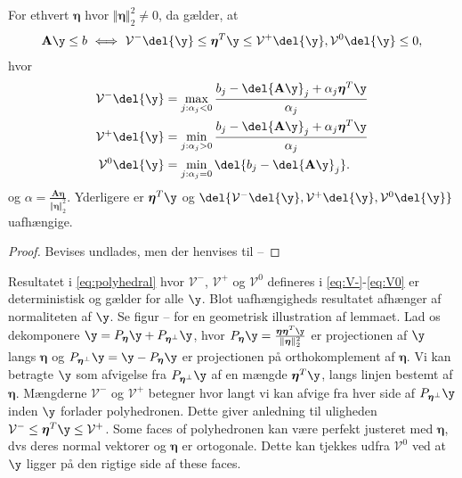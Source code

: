 \begin{lem} \label{lem:polyhedral}
For ethvert \(\boldsymbol{\eta}\) hvor \(\Vert  \boldsymbol{\eta} \Vert_2^2 \neq 0\), da gælder, at
\begin{align}
\mathbf{A} \y \leq b \ \Longleftrightarrow \ \mathcal{V}^- \del{\y} \leq \boldsymbol{\eta}^T \y \leq \mathcal{V}^+ \del{\y}, \mathcal{V}^0 \del{\y} \leq 0, \label{eq:polyhedral}
\end{align}
hvor
\begin{align}
\mathcal{V}^- \del{\y} &= \max_{j: \alpha_j <0} \frac{b_j - \del{\mathbf{A} \y}_j + \alpha_j \boldsymbol{\eta}^T \y}{\alpha_j} \label{eq:V-} \\
\mathcal{V}^+ \del{\y} &= \min_{j: \alpha_j >0} \frac{b_j - \del{\mathbf{A} \y}_j + \alpha_j \boldsymbol{\eta}^T \y}{\alpha_j} \label{eq:V+} \\
\mathcal{V}^0 \del{\y} &= \min_{j: \alpha_j =0} \del{b_j - \del{\mathbf{A} \y}_j}.  \label{eq:V0} 
\end{align}
og \(\alpha=\frac{\mathbf{A} \boldsymbol{\eta}}{\Vert  \boldsymbol{\eta} \Vert_2^2}\).
Yderligere  er \(\boldsymbol{\eta}^T \y\) og \(\del{\mathcal{V}^-\del{\y}, \mathcal{V}^+\del{\y},\mathcal{V}^0\del{\y}}\) uafhængige. 
\end{lem}
\begin{proof}
Bevises undlades, men der henvises til --
\end{proof}
Resultatet i \eqref{eq:polyhedral} hvor \(\mathcal{V}^-\), \(\mathcal{V}^+\) og \(\mathcal{V}^0\) defineres i \eqref{eq:V-}-\eqref{eq:V0} er deterministisk og gælder for alle \(\y\).
Blot uafhængigheds resultatet afhænger af normaliteten af \(\y\).
Se figur -- for en geometrisk illustration af lemmaet.
Lad os dekomponere \(\y=P_{\boldsymbol{\eta}} \y + P_{\boldsymbol{\eta}^\perp} \y\), hvor \(P_{\boldsymbol{\eta}} \y = \frac{\boldsymbol{\eta} \boldsymbol{\eta}^T \y}{\Vert \boldsymbol{\eta} \Vert_2^2}\) er projectionen af \(\y\) langs \(\boldsymbol{\eta}\) og  \(P_{\boldsymbol{\eta}^\perp} \y = \y - P_{\boldsymbol{\eta}} \y\) er projectionen på orthokomplement af \(\boldsymbol{\eta}\).
Vi kan betragte \(\y\) som afvigelse fra \(P_{\boldsymbol{\eta}^\perp} \y\) af en mængde \(\boldsymbol{\eta}^T \y\), langs linjen bestemt af \(\boldsymbol{\eta}\).
Mængderne \(\mathcal{V}^-\) og \(\mathcal{V}^+\) betegner hvor langt vi kan afvige fra hver side af \(P_{\boldsymbol{\eta}^\perp} \y\) inden \(\y\) forlader polyhedronen.
Dette giver anledning til uligheden \(\mathcal{V}^- \leq \boldsymbol{\eta}^T \y \leq \mathcal{V}^+\).
Some faces of polyhedronen kan være perfekt justeret med \(\boldsymbol{\eta}\), dvs deres normal vektorer og \(\boldsymbol{\eta}\) er ortogonale.
Dette kan tjekkes udfra \(\mathcal{V}^0\) ved at \(\y\) ligger på den rigtige side af these faces.  

